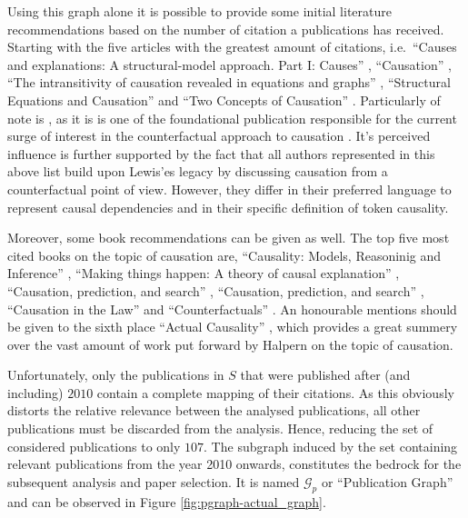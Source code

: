 \documentclass[11pt,a4paper]{book}
\theoremstyle{definition}
\theoremstyle{definition}
\theoremstyle{definition}
\theoremstyle{remark}
\newcommand{\pset}{S}
\newcommand{\pgraph}{\mathcal{G}_{p}}
\begin{document}
Using this graph alone it is possible to provide some initial literature recommendations based on the number of citation a publications has received. 
Starting with the five articles with the greatest amount of citations, i.e.\ 
``Causes and explanations: A structural-model approach. Part I: Causes'' \parencite{halpern2005causes}, 
``Causation'' \parencite{lewis1974causation},
``The intransitivity of causation revealed in equations and graphs'' \parencite{hitchcock2001intransitivity}, 
``Structural Equations and Causation'' \parencite{hall2007structural} and 
``Two Concepts of Causation'' \parencite{hall2004two}.
Particularly of note is \parencite{lewis1974causation}, as it is is one of the foundational publication responsible for the current surge of interest in the counterfactual approach to causation \parencite{beebee2009oxford}.
It's perceived influence is further supported by the fact that all authors represented in this above list build upon Lewis'es legacy by discussing causation from a counterfactual point of view. 
However, they differ in their preferred language to represent causal dependencies and in their specific definition of token causality. 


Moreover, some book recommendations can be given as well. The top five most cited books on the topic of causation are, ``Causality: Models, Reasoninig and Inference'' \parencite{pearl2009causality}, ``Making things happen: A theory of causal explanation'' \parencite{woodward2005making},
``Causation, prediction, and search'' \parencite{spirtes2000causation}, ``Causation, prediction, and search'' \parencite{spirtes2000causation}, ``Causation in the Law'' \parencite{hart1985causation}  and ``Counterfactuals'' \parencite{lewis2013counterfactuals}. An honourable mentions should be given to the sixth place ``Actual Causality'' \parencite{halpern2016actual}, which provides a great summery over the vast amount of work put forward by Halpern
on the topic of causation.



Unfortunately, only the publications in $\pset$ that were published after (and including) $2010$ contain a complete mapping of their citations. As this obviously distorts the relative relevance between the analysed publications, all other publications must be discarded from the analysis. Hence, reducing the set of considered publications to only $107$. The subgraph induced by the set containing relevant publications from the year 2010 onwards, constitutes the bedrock for the subsequent analysis and paper selection. It is named $\pgraph$ or ``Publication Graph'' and can be observed in Figure \ref{fig:pgraph-actual_graph}. 
\end{document}
